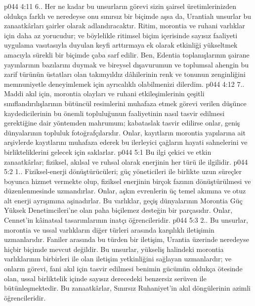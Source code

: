 \vs p044 4:11 6.\bibnobreakspace {}. Her ne kadar bu unsurların görevi sizin şairsel üretimlerinizden oldukça farklı ve neredeyse onu sınırsız bir biçimde aşsa da, Urantialı unsurlar bu zanaatkârları şairler olarak adlandıracaktır. Ritim, morontia ve ruhani varlıklar için daha az yorucudur; ve böylelikle ritimsel biçim içerisinde sayısız faaliyeti uygulama vasıtasıyla duyulan keyfi arttırmaya ek olarak etkinliği yükseltmek amacıyla sürekli bir biçimde çaba sarf edilir. Ben, Edentia toplanışlarının şairane yayınlarının bazılarını duymak ve bireysel dışavurumun ve toplumsal ahengin bu zarif türünün üstatları olan takımyıldız dâhilerinin renk ve tonunun zenginliğini memnuniyetle deneyimlemek için ayrıcalıklı olabilmenizi dilerdim.
\vs p044 4:12 7.\bibnobreakspace {}. Maddi akıl için, morontia olayları ve ruhani etkileşimlerinin çeşitli sınıflandırılışlarının bütüncül resimlerini muhafaza etmek görevi verilen düşünce kaydedicilerinin bu önemli topluluğunun faaliyetinin nasıl tasvir edilmesi gerektiğine dair yöntemden mahrumum; kabataslak tasvir edilirse onlar, geniş dünyalarının topluluk fotoğrafçılarıdır. Onlar, kayıtların morontia yapılarına ait arşivlerde kayıtlarını muhafaza ederek bu ilerleyici çağların hayati sahnelerini ve birlikteliklerini gelecek için saklarlar.
\vs p044 5:1 Bu ilgi çekici ve etkin zanaatkârlar; fiziksel, akılsal ve ruhsal olarak enerjinin her türü ile ilgilidir.
\vs p044 5:2 1.\bibnobreakspace {}. Fiziksel\hyp{}enerji dönüştürücüleri; güç yöneticileri ile birlikte uzun süreçler boyunca hizmet vermekte olup, fiziksel enerjinin birçok fazının dönüştürülmesi ve düzenlenmesinde uzmandırlar. Onlar, aşkın evrenlerin üç temel akımına ve otuz alt enerji ayrışımına aşinadırlar. Bu varlıklar, geçiş dünyalarının Morontia Güç Yüksek Denetimcileri’ne olan paha biçilemez desteğin bir parçasıdır. Onlar, Cennet’in kâinatsal tasarımlarının inatçı öğrencileridir.
\vs p044 5:3 2.\bibnobreakspace {}. Bu unsurlar, morontia ve ussal varlıkların diğer türleri arasında karşılıklı iletişimin uzmanlarıdır. Faniler arasında bu türden bir iletişim, Urantia üzerinde neredeyse hiçbir biçimde mevcut değildir. Bu unsurlar, yükseliş halindeki morontia varlıklarının birbirleri ile olan iletişim yetkinliğini sağlayan uzmanlardır; ve onların görevi, fani akıl için tasvir edilmesi benimin gücümün oldukça ötesinde olan, ussal birliktelik içinde sayısız derecedeki benzersiz serüven ile bütünleşmektedir. Bu zanaatkârlar, Sınırsız Ruhaniyet’in akıl döngülerinin azimli öğrencileridir.
